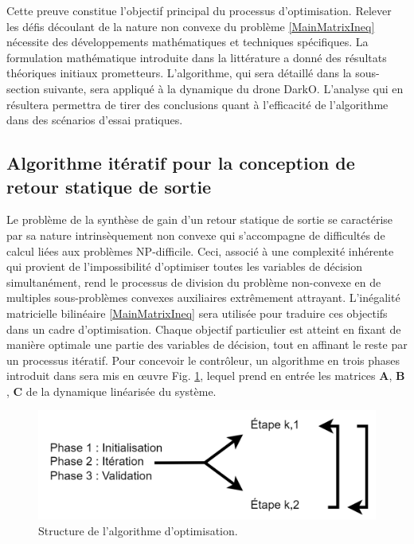 Cette preuve constitue l'objectif principal du processus d'optimisation. Relever les défis découlant de la nature non convexe du problème \ref{MainMatrixIneq} nécessite des développements mathématiques et techniques spécifiques. La formulation mathématique introduite dans la littérature a donné des résultats théoriques initiaux prometteurs. L'algorithme, qui sera détaillé dans la sous-section suivante, sera appliqué à la dynamique du drone DarkO. L'analyse qui en résultera permettra de tirer des conclusions quant à l'efficacité de l'algorithme dans des scénarios d'essai pratiques.


\subsection{Algorithme itératif pour la conception de retour statique de sortie}
\label{3a}

Le problème de la synthèse de gain d'un retour statique de sortie se caractérise par sa nature intrinsèquement non convexe qui s'accompagne de difficultés de calcul liées aux problèmes NP-difficile. Ceci, associé à une complexité inhérente qui provient de l'impossibilité d'optimiser toutes les variables de décision simultanément, rend le processus de division du problème non-convexe en de multiples sous-problèmes convexes auxiliaires extrêmement attrayant. L'inégalité matricielle bilinéaire \eqref{MainMatrixIneq} sera utilisée pour traduire ces objectifs dans un cadre d'optimisation. Chaque objectif particulier est atteint en fixant de manière optimale une partie des variables de décision, tout en affinant le reste par un processus itératif. Pour concevoir le contrôleur, un algorithme en trois phases introduit dans \cite{Arzelier2018} sera mis en œuvre Fig. \ref{AlgoPhases}, lequel prend en entrée les matrices $\boldsymbol{A}$, $\boldsymbol{B}$, $\boldsymbol{C}$ de la dynamique linéarisée du système.

\begin{figure}[hbt]
    \centering
      \includegraphics[width=0.6\columnwidth]{figures/LMIAlgo.png}
      \vspace{-0.2cm}\caption{Structure de l'algorithme d'optimisation.}
      \label{AlgoPhases}
\end{figure} 

